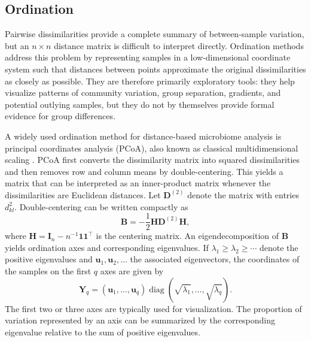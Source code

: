 \subsection{Ordination}
\label{sec:3community:between:ordination}

Pairwise dissimilarities provide a complete summary of between-sample variation, but an $n\times n$ distance matrix is difficult to interpret directly. Ordination methods address this problem by representing samples in a low-dimensional coordinate system such that distances between points approximate the original dissimilarities as closely as possible. They are therefore primarily exploratory tools: they help visualize patterns of community variation, group separation, gradients, and potential outlying samples, but they do not by themselves provide formal evidence for group differences.

\newpage
A widely used ordination method for distance-based microbiome analysis is principal coordinates analysis (PCoA), also known as classical multidimensional scaling \citep{gower1966some,legendre2012numerical}. PCoA first converts the dissimilarity matrix into squared dissimilarities and then removes row and column means by double-centering. This yields a matrix that can be interpreted as an inner-product matrix whenever the dissimilarities are Euclidean distances. Let $\mathbf{D}^{(2)}$ denote the matrix with entries $d_{kl}^2$. Double-centering can be written compactly as
\begin{equation}
\mathbf{B}=-\frac{1}{2}\mathbf{H}\mathbf{D}^{(2)}\mathbf{H},
\end{equation}
where $\mathbf{H}=\mathbf{I}_n-n^{-1}\mathbf{1}\mathbf{1}^\top$ is the centering matrix.
An eigendecomposition of $\mathbf{B}$ yields ordination axes and corresponding eigenvalues. If $\lambda_1\geq\lambda_2\geq\cdots$ denote the positive eigenvalues and $\mathbf{u}_1,\mathbf{u}_2,\ldots$ the associated eigenvectors, the coordinates of the samples on the first $q$ axes are given by
\begin{equation}
\mathbf{Y}_q=(\mathbf{u}_1,\ldots,\mathbf{u}_q)\operatorname{diag}(\sqrt{\lambda_1},\ldots,\sqrt{\lambda_q}).
\end{equation}
The first two or three axes are typically used for visualization. The proportion of variation represented by an axis can be summarized by the corresponding eigenvalue relative to the sum of positive eigenvalues.

